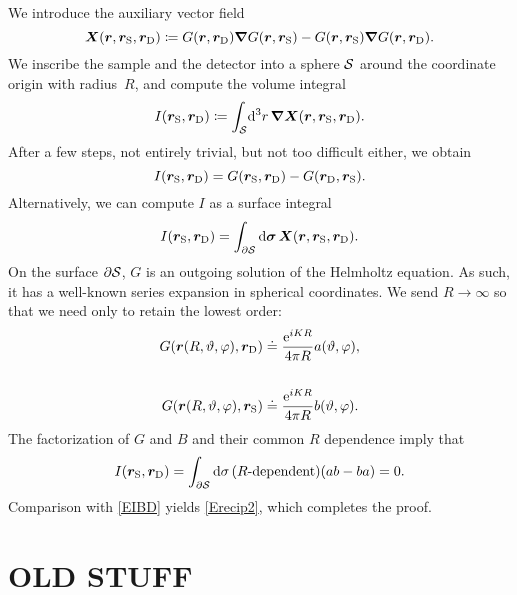 We introduce the auxiliary vector field
\begin{equation}
  \bm{X}(\bm{r},\bm{r}_\text{S},\bm{r}_\text{D})\coloneqq G(\bm{r},\bm{r}_\text{D})\bm{\nabla} G(\bm{r},\bm{r}_\text{S}) - G(\bm{r},\bm{r}_\text{S})\bm{\nabla} G(\bm{r},\bm{r}_\text{D}).
\end{equation}
We inscribe the sample and the detector
into a sphere $\mathcal{S}$ around the coordinate origin with radius~$R$,
and compute the volume integral
\begin{equation}\label{Eprerecipro}
    I(\rS,\rD) \coloneqq \displaystyle\int_\Sphere\!\d^3r\,\Nabla \v{X}(\r,\rS,\rD).
\end{equation}
After a few steps, not entirely trivial, but not too difficult either,
we obtain
\begin{equation}\label{EIBD}
  I(\rS,\rD) = G(\rS,\rD) - G(\rD,\rS).
\end{equation}
Alternatively, we can compute $I$ as a surface integral
\begin{equation}
  I(\bm{r}_\text{S},\bm{r}_\text{D})
  =\displaystyle\int_{\partial\mathcal{S}}\mathrm d\bm{\sigma}\,\bm{X}(\bm{r},\bm{r}_\text{S},\bm{r}_\text{D}).
\end{equation}
On the surface $\partial\mathcal{S}$,
$G$ is an outgoing solution of the Helmholtz equation.
As such, it has a well-known series expansion in spherical coordinates.
We send $R\to\infty$ so that we need only to retain the lowest order:
\begin{align}
   G(\bm{r}(R,\vartheta,\varphi),\bm{r}_\text{D})
   &\doteq\displaystyle \frac{\mathrm e^{iKR}}{4\pi R} a(\vartheta,\varphi),
   \\[3.8ex]
   G(\bm{r}(R,\vartheta,\varphi),\bm{r}_\text{S})
   &\doteq\displaystyle \frac{\mathrm e^{iKR}}{4\pi R} b(\vartheta,\varphi).
\end{align}
The factorization of $G$ and $B$ and their common $R$ dependence imply that
\begin{equation}
  I(\bm{r}_\text{S},\bm{r}_\text{D})
  =\displaystyle\int_{\partial\mathcal{S}}\mathrm d\sigma\,
       (\text{$R$-dependent})(ab-ba)
  = 0.
\end{equation}
Comparison with \cref{EIBD} yields \cref{Erecip2},
which completes the proof.

%
%


\iffalse
\section*{OLD STUFF}


